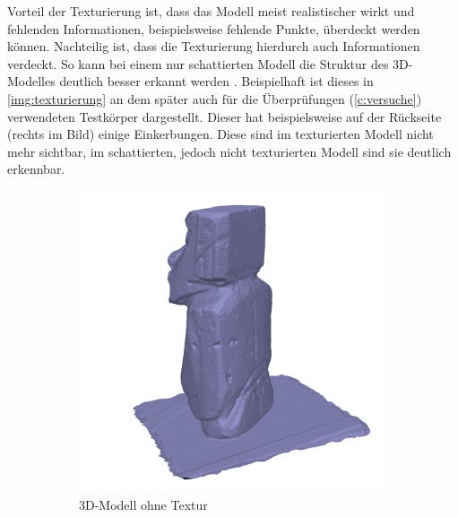 \documentclass[./00PhotoBox.tex]{subfiles}
\begin{document}
Vorteil der Texturierung ist, dass das Modell meist realistischer wirkt und fehlenden Informationen, beispielsweise fehlende Punkte, überdeckt werden können. Nachteilig ist, dass die Texturierung hierdurch auch Informationen verdeckt. So kann bei einem nur schattierten Modell die Struktur des 3D-Modelles deutlich besser erkannt werden \citep[S. 702]{luhmann}. Beispielhaft ist dieses in \autoref{img:texturierung} an dem später auch für die Überprüfungen (\autoref{c:versuche}) verwendeten Testkörper dargestellt. Dieser hat beispielsweise auf der Rückseite (rechts im Bild) einige Einkerbungen. Diese sind im texturierten Modell nicht mehr sichtbar, im schattierten, jedoch nicht texturierten Modell sind sie deutlich erkennbar.

\begin{figure}
    \centering
    \begin{subfigure}{0.49\textwidth}
        \includegraphics[width=1\linewidth]{img/2_grundlagen/solid.jpg}
        \centering
        \caption{3D-Modell ohne Textur} %
        \label{img:ohne_textur} %
    \end{subfigure}
    \begin{subfigure}{0.49\textwidth}

\end{subfigure}
\end{figure}
\end{document}
